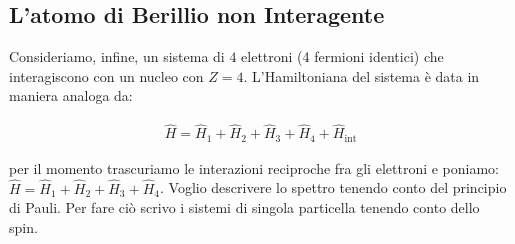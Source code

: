 \subsection{L'atomo di Berillio non Interagente}

	Consideriamo, infine, un sistema di $4$ elettroni (4 fermioni identici) che interagiscono con un nucleo con $Z = 4$. L'Hamiltoniana del sistema è data in maniera analoga da:
	
\begin{align*}
	\hat{H} = \hat{H}_1 + \hat{H}_2 + \hat{H}_3 + \hat{H}_4 + \hat{H}_{\text{int}}
\end{align*}
	
	per il momento trascuriamo le interazioni reciproche fra gli elettroni e poniamo: $\hat{H} = \hat{H}_1 + \hat{H}_2 + \hat{H}_3 + \hat{H}_4$. Voglio descrivere lo spettro tenendo conto del principio di Pauli. Per fare ciò scrivo i sistemi di singola particella tenendo conto dello spin.
	
